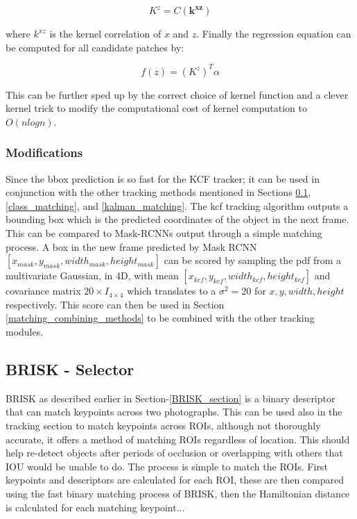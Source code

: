 \documentclass[a4paper,11pt,notitlepage]{article}
\begin{document}
\begin{equation}
K^{z} = C(\mathbf{k^{xz}})
\end{equation}

where $k^{xz}$ is the kernel correlation of $x$ and $z$. Finally the regression equation can be computed for all candidate patches by:

\begin{equation}
f(z) = (K^{z})^{T} \alpha
\end{equation}

This can be further sped up by the correct choice of kernel function and a clever kernel trick to modify the computational cost of kernel computation to $O(nlogn)$. 

\subsubsection{Modifications}

Since the bbox prediction is so fast for the KCF tracker; it can be used in conjunction with the other tracking methods mentioned in Sections \ref{BRISK_matching}, \ref{class_matching}, and \ref{kalman_matching}. The kcf tracking algorithm outputs a bounding box which is the predicted coordinates of the object in the next frame. This can be compared to Mask-RCNNs output through a simple matching process. A box in the new frame predicted by Mask RCNN $[x_{mask},y_{mask},width_{mask},height_{mask}]$ can be scored by sampling the pdf from a multivariate Gaussian, in 4D, with mean $[x_{kcf},y_{kcf},width_{kcf},height_{kcf}]$ and covariance matrix $20 \times I_{4 \times 4}$ which translates to a $\sigma^{2} = 20$ for $x,y,width,height$ respectively. This score can then be used in Section \ref{matching_combining_methods} to be combined with the other tracking modules.


\subsection{BRISK - Selector} \label{BRISK_matching}
BRISK as described earlier in Section-\ref{BRISK_section} is a binary descriptor that can match keypoints across two photographs. This can be used also in the tracking section to match keypoints across ROIs, although not thoroughly accurate, it offers a method of matching ROIs regardless of location. This should help re-detect objects after periods of occlusion or overlapping with others that IOU would be unable to do. The process is simple to match the ROIs. First keypoints and descriptors are calculated for each ROI, these are then compared using the fast binary matching process of BRISK, then the Hamiltonian distance is calculated for each matching keypoint...
\end{document}

